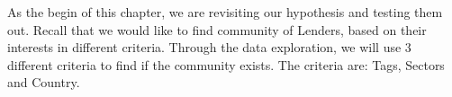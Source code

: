 As the begin of this chapter, we are revisiting our hypothesis and testing them out.
Recall that we would like to find community of Lenders, based on their interests in different criteria.
Through the data exploration, we will use 3 different criteria to find if the community exists.
The criteria are: Tags, Sectors and Country.

